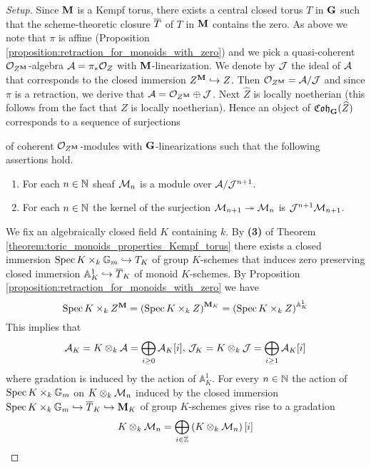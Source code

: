 \begin{proof}[Setup]
Since $\mathbf{M}$ is a Kempf torus, there exists a central closed torus $T$ in $\mathbf{G}$ such that the scheme-theoretic closure $\overline{T}$ of $T$ in $\mathbf{M}$ contains the zero. As above we note that $\pi$ is affine (Proposition \ref{proposition:retraction_for_monoids_with_zero}) and we pick a quasi-coherent ${\mathcal O}_{Z^{\mathbf{M}}}$-algebra ${\mathcal A} = \pi_*{\mathcal O}_Z$ with $\mathbf{M}$-linearization. We denote by ${\mathcal J}$ the ideal of ${\mathcal A}$ that corresponds to the closed immersion $Z^{\mathbf{M}}\hookrightarrow Z$. Then ${\mathcal O}_{Z^{\mathbf{M}}} = {\mathcal A}/{\mathcal J}$ and since $\pi$ is a retraction, we derive that ${\mathcal A} = {\mathcal O}_{Z^{\mathbf{M}}}\oplus {\mathcal J}$. Next $\widehat{Z}$ is locally noetherian (this follows from the fact that $Z$ is locally noetherian). Hence an object of $\mathfrak{Coh}_{\mathbf{G}}(\widehat{Z})$ corresponds to a sequence of surjections
\begin{center}
\end{center}
of coherent ${\mathcal O}_{Z^{\mathbf{M}}}$-modules with $\mathbf{G}$-linearizations such that the following assertions hold.
\begin{enumerate}[label=\textbf{(\arabic*)}, leftmargin=3.0em]
\item For each $n\in {\mathbb N}$ sheaf ${\mathcal M}_n$ is a module over ${\mathcal A}/{\mathcal J}^{n+1}$.
\item For each $n\in {\mathbb N}$ the kernel of the surjection ${\mathcal M}_{n+1}\twoheadrightarrow {\mathcal M}_n$ is ${\mathcal J}^{n+1}{\mathcal M}_{n+1}$.
\end{enumerate}
We fix an algebraically closed field $K$ containing $k$. By \textbf{(3)} of Theorem \ref{theorem:toric_monoids_properties_Kempf_torus} there exists a closed immersion $\mathrm{Spec}\, K\times_k \mathbb{G}_m\hookrightarrow T_K$ of group $K$-schemes that induces zero preserving closed immersion $\mathbb{A}^1_K\hookrightarrow \overline{T}_K$ of monoid $K$-schemes. By Proposition \ref{proposition:retraction_for_monoids_with_zero} we have
$$\mathrm{Spec}\, K\times_k Z^{\mathbf{M}} = \left(\mathrm{Spec}\, K\times_k Z\right)^{\mathbf{M}_K} = \left(\mathrm{Spec}\, K\times_k Z\right)^{\mathbb{A}^1_K}$$
This implies that
$${\mathcal A}_K = K\otimes_k{\mathcal A} = \bigoplus_{i\geq 0}{\mathcal A}_K[i],\,{\mathcal J}_K = K\otimes_k{\mathcal J} = \bigoplus_{i\geq 1}{\mathcal A}_K[i]$$
where gradation is induced by the action of $\mathbb{A}^1_K$. For every $n\in {\mathbb N}$ the action of $\mathrm{Spec}\, K\times_k \mathbb{G}_m$ on $K\otimes_k{\mathcal M}_n$ induced by the closed immersion $\mathrm{Spec}\, K\times_k \mathbb{G}_m \hookrightarrow \overline{T}_K\hookrightarrow \mathbf{M}_K$ of group $K$-schemes gives rise to a gradation
$$K\otimes_k{\mathcal M}_n = \bigoplus_{i\in {\mathbb Z}}\left(K\otimes_k{\mathcal M}_n\right)[i]$$
\end{proof}

